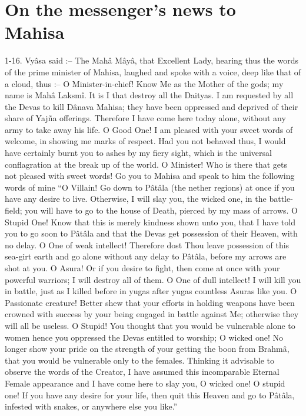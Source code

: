 ﻿\chapter{On the messenger's news to Mahisa}

1-16. Vy\^asa said :-- The Mah\^a M\^ay\^a, that Excellent Lady, hearing thus the words of the prime minister of Mahisa, laughed and spoke with a voice, deep like that of a cloud, thus :-- O Minister-in-chief! Know Me as the Mother of the gods; my name is Mah\^a Laksm\^i. It is I that destroy all the Daityas. I am requested by all the Devas to kill D\^anava Mahisa; they have been oppressed and deprived of their share of Yajña offerings. Therefore I have come here today alone, without any army to take away his life. O Good One! I am pleased with your sweet words of welcome, in showing me marks of respect. Had you not behaved thus, I would have certainly burnt you to ashes by my fiery sight, which is the universal conflagration at the break up of the world. O Minister! Who is there that gets not pleased with sweet words! Go you to Mahisa and speak to him the following words of mine ``O Villain! Go down to P\^at\^ala (the nether regions) at once if you have any desire to live. Otherwise, I will slay you, the wicked one, in the battle-field; you will have to go to the house of Death, pierced by my mass of arrows. O Stupid One! Know that this is merely kindness shown unto you, that I have told you to go soon to P\^at\^ala and that the Devas get possession of their Heaven, with no delay. O One of weak intellect! Therefore dost Thou leave possession of this sea-girt earth and go alone without any delay to P\^at\^ala, before my arrows are shot at you. O Asura! Or if you desire to fight, then come at once with your powerful warriors; I will destroy all of them. O One of dull intellect! I will kill you in battle, just as I killed before in yugas after yugas countless Asuras like you. O Passionate creature! Better shew that your efforts in holding weapons have been crowned with success by your being engaged in battle against Me; otherwise they will all be useless. O Stupid! You thought that you would be vulnerable alone to women hence you oppressed the Devas entitled to worship; O wicked one! No longer show your pride on the strength of your getting the boon from Brahm\^a, that you would be vulnerable only to the females. Thinking it advisable to observe the words of the Creator, I have assumed this incomparable Eternal Female appearance and I have come here to slay you, O wicked one! O stupid one! If you have any desire for your life, then quit this Heaven and go to P\^at\^ala, infested with snakes, or anywhere else you like.''

